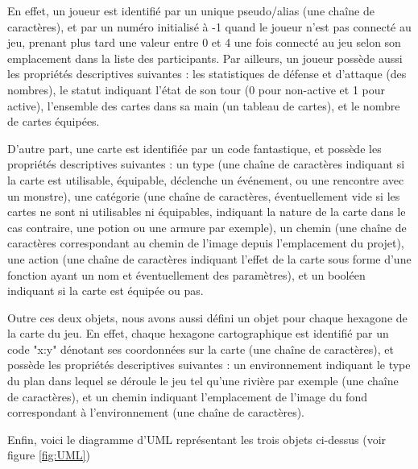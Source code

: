 \documentclass[12pt]{report}
\begin{document}
	En effet, un joueur est identifié par un unique pseudo/alias (une chaîne de caractères), et par un numéro initialisé à -1 quand le joueur n'est pas connecté au jeu, prenant plus tard une valeur entre 0 et 4 une fois connecté au jeu selon son emplacement dans la liste des participants. Par ailleurs, un joueur possède aussi les propriétés descriptives suivantes : les statistiques de défense et d'attaque (des nombres), le statut indiquant l'état de son tour (0 pour non-active et 1 pour active), l'ensemble des cartes dans sa main (un tableau de cartes), et le nombre de cartes équipées.

	D'autre part, une carte est identifiée par un code fantastique, et possède les propriétés descriptives suivantes : un type (une chaîne de caractères indiquant si la carte est utilisable, équipable, déclenche un événement, ou une rencontre avec un monstre), une catégorie (une chaîne de caractères, éventuellement vide si les cartes ne sont ni utilisables ni équipables, indiquant la nature de la carte dans le cas contraire, une potion ou une armure par exemple), un chemin (une chaîne de caractères correspondant au chemin de l'image depuis l'emplacement du projet), une action (une chaîne de caractères indiquant l'effet de la carte sous forme d'une fonction ayant un nom et éventuellement des paramètres), et un booléen indiquant si la carte est équipée ou pas.

	Outre ces deux objets, nous avons aussi défini un objet pour chaque hexagone de la carte du jeu. En effet, chaque hexagone cartographique est identifié par un code "x:y" dénotant ses coordonnées sur la carte (une chaîne de caractères), et possède les propriétés descriptives suivantes : un environnement indiquant le type du plan dans lequel se déroule le jeu tel qu'une rivière par exemple (une chaîne de caractères), et un chemin indiquant l'emplacement de l'image du fond correspondant à l'environnement (une chaîne de caractères).

	Enfin, voici le diagramme d'UML représentant les trois objets ci-dessus (voir figure \ref{fig:UML})
\end{document}
